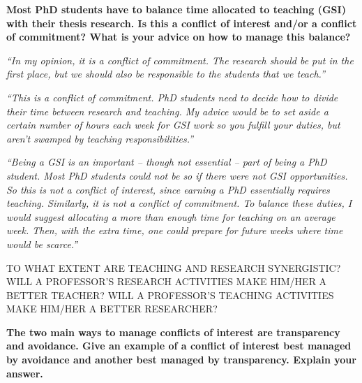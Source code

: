 \documentclass[portrait,11pt]{seminar}
\begin{document}

\bs 
{\bf 
Most PhD students have to balance time allocated to teaching (GSI) with their thesis research. Is this a conflict of interest and/or a conflict of commitment? What is your advice on how to manage this balance?
}


{\it ``In my opinion, it is a conflict of commitment. The research should be put in the first place, but we should also be responsible to the students that we teach.''}

\medskip

{\it ``This is a conflict of commitment. PhD students need to decide how to divide their time between research and teaching. My advice would be to set aside a certain number of hours each week for GSI work so you fulfill your duties, but aren’t swamped by teaching responsibilities.''}




\es 
\bs
{\it ``Being a GSI is an important – though not essential – part of being a PhD student. Most PhD students could not be so if there were not GSI opportunities. So this is not a conflict of interest, since earning a PhD essentially requires teaching. Similarly, it is not a conflict of commitment. To balance these duties, I would suggest allocating a more than enough time for teaching on an average week. Then, with the extra time, one could prepare for future weeks where time would be scarce.''}

\medskip

TO WHAT EXTENT ARE TEACHING AND RESEARCH SYNERGISTIC? WILL A PROFESSOR'S RESEARCH ACTIVITIES MAKE HIM/HER A BETTER TEACHER? WILL A PROFESSOR'S TEACHING ACTIVITIES MAKE HIM/HER A BETTER RESEARCHER?
\es

\bs
{\bf
The two main ways to manage conflicts of interest are transparency and avoidance. Give an example of a conflict of interest best managed by avoidance and another best managed by transparency. Explain your answer.
}
\end{document}
